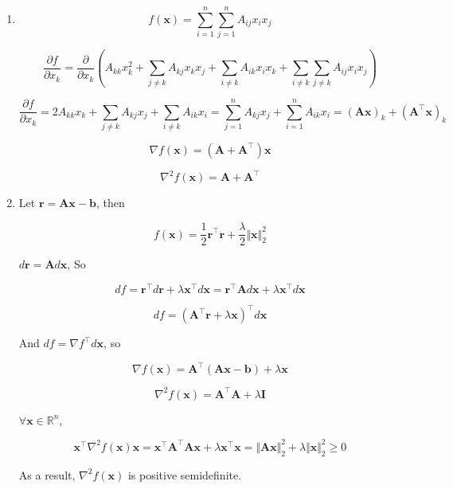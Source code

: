 \documentclass[10pt,a4paper]{article}
\begin{document}
\begin{enumerate}
    \item[1. ]
    $$
    f(\mathbf{x}) = \sum_{i=1}^n \sum_{j=1}^n A_{ij} x_i x_j
    $$

    $$
    \frac{\partial f}{\partial x_k} = \frac{\partial}{\partial x_k} \left( A_{kk} x_k^2 + \sum_{j \neq k} A_{kj} x_k x_j + \sum_{i \neq k} A_{ik} x_i x_k + \sum_{i \neq k} \sum_{j \neq k} A_{ij} x_i x_j \right)
    $$

    $$
    \frac{\partial f}{\partial x_k} = 2 A_{kk} x_k + \sum_{j \neq k} A_{kj} x_j + \sum_{i \neq k} A_{ik} x_i = \sum_{j=1}^n A_{kj} x_j + \sum_{i=1}^n A_{ik} x_i = (\mathbf{A}\mathbf{x})_k + (\mathbf{A}^\top \mathbf{x})_k
    $$

    $$
    \nabla f(\mathbf{x}) = (\mathbf{A} + \mathbf{A}^\top)\mathbf{x}
    $$

    $$
    \nabla^2 f(\mathbf{x}) = \mathbf{A} + \mathbf{A}^\top
    $$

    \item[2. ]
    Let $\mathbf{r} = \mathbf{A}\mathbf{x}-\mathbf{b}$, then

    $$
    f(\mathbf{x}) = \frac12 \mathbf{r}^\top \mathbf{r} + \frac{\lambda}{2} \Vert\mathbf{x}\Vert_2^2
    $$

    $d\mathbf{r} = \mathbf{A} d\mathbf{x}$, So
    
    $$
    d f = \mathbf{r}^\top d\mathbf{r} + \lambda \mathbf{x}^\top d\mathbf{x} = \mathbf{r}^\top \mathbf{A} d\mathbf{x} + \lambda \mathbf{x}^\top d\mathbf{x}
    $$

    $$
    d f = (\mathbf{A}^\top \mathbf{r} + \lambda \mathbf{x})^\top d\mathbf{x}
    $$

    And $d f = \nabla f^\top d\mathbf{x}$, so

    $$
    \nabla f(\mathbf{x}) = \mathbf{A}^\top (\mathbf{A}\mathbf{x}-\mathbf{b}) + \lambda \mathbf{x}
    $$

    $$
    \nabla^2 f(\mathbf{x}) = \mathbf{A}^\top \mathbf{A} + \lambda \mathbf{I}
    $$

    $\forall \mathbf{x} \in \mathbb{R}^n$,
    
    $$
    \mathbf{x}^\top \nabla^2 f(\mathbf{x}) \mathbf{x}
    = \mathbf{x}^\top \mathbf{A}^\top \mathbf{A} \mathbf{x} + \lambda \mathbf{x}^\top \mathbf{x}
    = \Vert\mathbf{A}\mathbf{x}\Vert_2^2 + \lambda \Vert\mathbf{x}\Vert_2^2
    \geq 0
    $$

    As a result, $\nabla^2 f(\mathbf{x})$ is positive semidefinite.


\end{enumerate}
\end{document}
